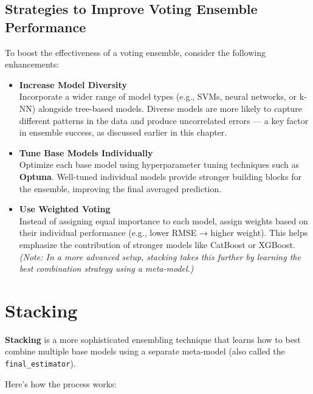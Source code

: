 \documentclass[
  letterpaper,
  DIV=11,
  numbers=noendperiod]{scrreprt}
\begin{document}
\subsection{Strategies to Improve Voting Ensemble
Performance}\label{strategies-to-improve-voting-ensemble-performance}

To boost the effectiveness of a voting ensemble, consider the following
enhancements:

\begin{itemize}
\item
  \textbf{Increase Model Diversity}\\
  Incorporate a wider range of model types (e.g., SVMs, neural networks,
  or k-NN) alongside tree-based models. Diverse models are more likely
  to capture different patterns in the data and produce uncorrelated
  errors --- a key factor in ensemble success, as discussed earlier in
  this chapter.
\item
  \textbf{Tune Base Models Individually}\\
  Optimize each base model using hyperparameter tuning techniques such
  as \textbf{Optuna}. Well-tuned individual models provide stronger
  building blocks for the ensemble, improving the final averaged
  prediction.
\item
  \textbf{Use Weighted Voting}\\
  Instead of assigning equal importance to each model, assign weights
  based on their individual performance (e.g., lower RMSE → higher
  weight). This helps emphasize the contribution of stronger models like
  CatBoost or XGBoost.\\
  \emph{(Note: In a more advanced setup, stacking takes this further by
  learning the best combination strategy using a meta-model.)}
\end{itemize}

\section{Stacking}\label{stacking}

\textbf{Stacking} is a more sophisticated ensembling technique that
learns how to best combine multiple base models using a separate
meta-model (also called the \texttt{final\_estimator}).

Here's how the process works:
\end{document}
